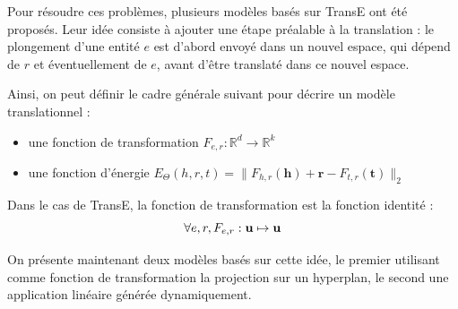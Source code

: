 Pour résoudre ces problèmes, plusieurs modèles basés sur TransE ont été proposés. Leur idée consiste à ajouter une étape préalable à la translation : le plongement d'une entité $e$ est d'abord envoyé dans un nouvel espace, qui dépend de $r$ et éventuellement de $e$, avant d'être translaté dans ce nouvel espace.

Ainsi, on peut définir le cadre générale suivant pour décrire un modèle translationnel :
\begin{itemize}
    \item une fonction de transformation $F_{e, r} : \mathbb{R}^d \rightarrow \mathbb{R}^{k}$
    \item une fonction d'énergie $E_\Theta(h, r, t) = \| F_{h, r}(\mathbf{h}) + \mathbf{r} - F_{t, r}(\mathbf{t}) \|_2 $
\end{itemize}

Dans le cas de TransE, la fonction de transformation est la fonction identité :
\begin{equation}
    \forall e, r, F_{e, r} : \bf{u} \mapsto \bf{u}
\end{equation}

On présente maintenant deux modèles basés sur cette idée, le premier utilisant comme fonction de transformation la projection sur un hyperplan, le second une application linéaire générée dynamiquement.



